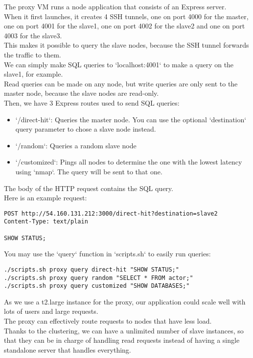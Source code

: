 \documentclass[11pt]{article}
\begin{document}
    The proxy VM runs a node application that consists of an Express server. \\
    When it first launches, it creates 4 SSH tunnels, one on port 4000 for the master, one on port 4001 for the slave1, one on port 4002 for the slave2 and one on port 4003 for the slave3. \\
    This makes it possible to query the slave nodes, because the SSH tunnel forwards the traffic to them. \\
    We can simply make SQL queries to `localhost:4001` to make a query on the slave1, for example. \\
    Read queries can be made on any node, but write queries are only sent to the master node, because the slave nodes are read-only. \\

    Then, we have 3 Express routes used to send SQL queries:

    \begin{itemize}
        \item `/direct-hit`: Queries the master node.
        You can use the optional `destination` query parameter to chose a slave node instead.
        \item `/random`: Queries a random slave node
        \item `/customized`: Pings all nodes to determine the one with the lowest latency using `nmap`.
        The query will be sent to that one.
    \end{itemize}

    The body of the HTTP request contains the SQL query. \\

    Here is an example request:
    \begin{verbatim}
POST http://54.160.131.212:3000/direct-hit?destination=slave2
Content-Type: text/plain

SHOW STATUS;
    \end{verbatim}

    You may use the `query` function in `scripts.sh` to easily run queries:
    \begin{verbatim}
./scripts.sh proxy query direct-hit "SHOW STATUS;"
./scripts.sh proxy query random "SELECT * FROM actor;"
./scripts.sh proxy query customized "SHOW DATABASES;"
    \end{verbatim}

    As we use a t2.large instance for the proxy, our application could scale well with lots of users and large requests. \\
    The proxy can effectively route requests to nodes that have less load. \\
    Thanks to the clustering, we can have a unlimited number of slave instances, so that they can be in charge of handling read requests instead of having a single standalone server that handles everything.
\end{document}
